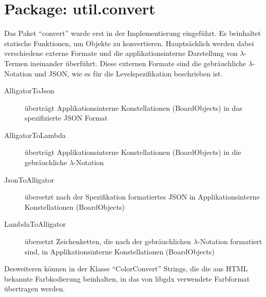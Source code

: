 \section{Package: util.convert}
Das Paket "`convert"' wurde erst in der Implementierung eingeführt.
Es beinhaltet statische Funktionen, um Objekte zu konvertieren.
Hauptsächlich werden dabei verschiedene externe Formate und die applikationsinterne Darstellung von \(\lambda\)-Termen ineinander überführt.
Diese externen Formate sind die gebräuchliche \(\lambda\)-Notation und JSON, wie es für die Levelspezifikation beschrieben ist.
\begin{description}
	\item[AlligatorToJson] überträgt Applikationsinterne Konstellationen (BoardObjects) in das spezifizierte JSON Format
	\item[AlligatorToLambda] überträgt Applikationsinterne Konstellationen (BoardObjects) in die gebräuchliche \(\lambda\)-Notation
	\item[JsonToAlligator] übersetzt nach der Spezifikation formatiertes JSON in Applikationsinterne Konstellationen (BoardObjects)
	\item[LambdaToAlligator] übersetzt Zeichenketten, die nach der gebräuchlichen \(\lambda\)-Notation formatiert sind, in Applikationsinterne Konstellationen (BoardObjects)
\end{description}
Desweiteren können in der Klasse "`ColorConvert"' Strings, die die aus HTML bekannte Farbkodierung beinhalten, in das von libgdx verwendete Farbformat übertragen werden.
